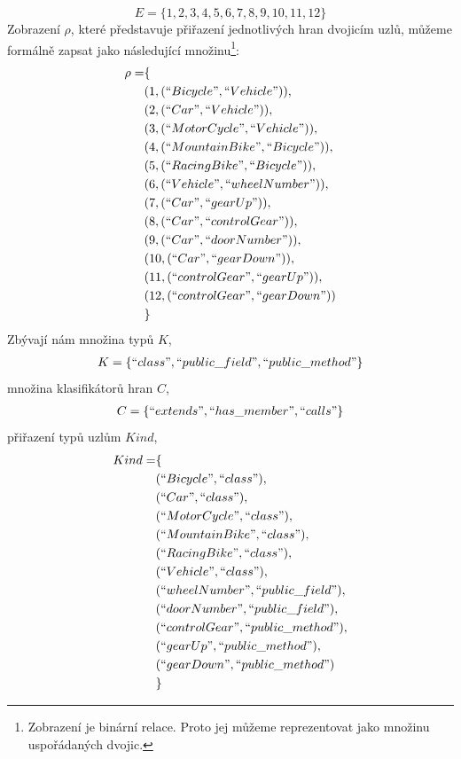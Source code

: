 \begin{displaymath}
  E = \{1, 2, 3, 4, 5, 6, 7, 8, 9, 10, 11, 12\}
\end{displaymath}
Zobrazení $\rho$, které představuje přiřazení jednotlivých hran dvojicím uzlů, můžeme formálně zapsat jako následující množinu\footnote{Zobrazení je binární relace. Proto jej můžeme reprezentovat jako množinu uspořádaných dvojic.}:
\begin{align*}
  \rho = &\{ \\
  &(1, (``Bicycle", ``Vehicle")), \\
  &(2, (``Car", ``Vehicle")), \\
  &(3, (``MotorCycle", ``Vehicle")), \\
  &(4, (``MountainBike", ``Bicycle")), \\
  &(5, (``RacingBike", ``Bicycle")), \\
  &(6, (``Vehicle", ``wheelNumber")), \\
  &(7, (``Car", ``gearUp")), \\
  &(8, (``Car", ``controlGear")), \\
  &(9, (``Car", ``doorNumber")), \\
  &(10, (``Car", ``gearDown")), \\
  &(11, (``controlGear", ``gearUp")), \\
  &(12, (``controlGear", ``gearDown")) \\
  &\}
\end{align*}
Zbývají nám množina typů $K$,
\begin{align*}
  K = \{ ``class", ``public\_field", ``public\_method" \}
\end{align*}
množina klasifikátorů hran $C$,
\begin{align*}
  C = \{ ``extends", ``has\_member", ``calls" \}
\end{align*}
přiřazení typů uzlům $Kind$,
\begin{align*}
  Kind = &\{ \\
  &(``Bicycle", ``class"), \\
  &(``Car", ``class"), \\
  &(``MotorCycle", ``class"), \\
  &(``MountainBike", ``class"), \\
  &(``RacingBike", ``class"), \\
  &(``Vehicle", ``class"), \\
  &(``wheelNumber", ``public\_field"), \\
  &(``doorNumber", ``public\_field"), \\
  &(``controlGear", ``public\_method"), \\
  &(``gearUp", ``public\_method"), \\
  &(``gearDown", ``public\_method") \\
  &\}
\end{align*}
